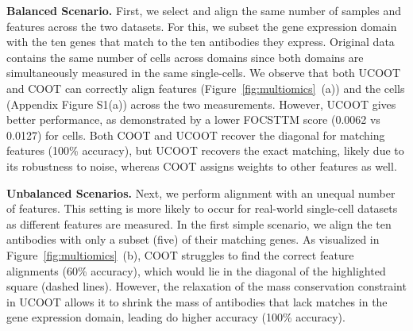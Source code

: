 
\textbf{Balanced Scenario.} First, we select and align the same number of samples and features
across the two datasets. For this, we subset the gene expression domain with the ten genes that
match to the ten antibodies they express. Original data contains the same number of cells
across domains since both domains are simultaneously measured in the same single-cells.
We observe that both UCOOT and COOT can correctly align features (Figure~\ref{fig:multiomics}~(a))
and the cells (Appendix Figure S1(a)) across the two measurements. However,
UCOOT gives better performance, as demonstrated by a lower FOCSTTM score (0.0062 vs 0.0127)
for cells. Both COOT and UCOOT recover the diagonal for matching features (100\% accuracy),
but UCOOT recovers the exact matching, likely due to its robustness to noise,
whereas COOT assigns weights to other features as well.

\textbf{Unbalanced Scenarios.} Next, we perform alignment with an unequal number of features.
This setting is more likely to occur for real-world single-cell datasets as different features
are measured. In the first simple scenario, we align the ten antibodies with only a subset (five)
of their matching genes. As visualized in Figure~\ref{fig:multiomics}~(b),
COOT struggles to find the correct feature alignments (60\% accuracy),
which would lie in the diagonal of the highlighted square (dashed lines). However,
the relaxation of the mass conservation constraint in UCOOT allows it to shrink
the mass of antibodies that lack matches in the gene expression domain,
leading do higher accuracy (100\% accuracy).

